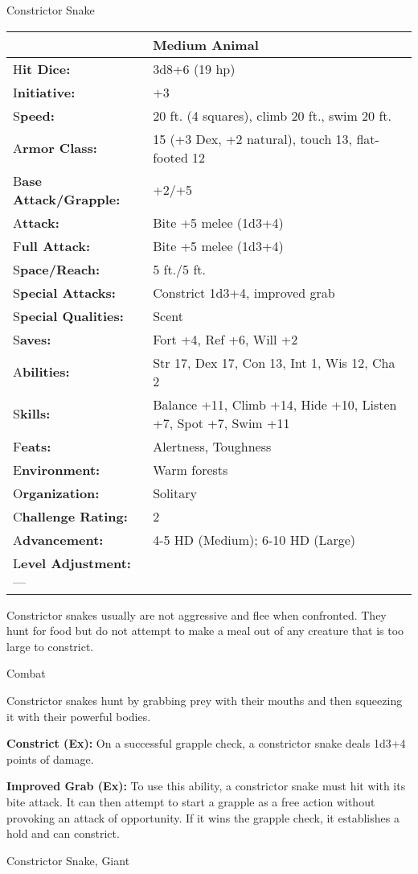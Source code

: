 \documentclass{article}
\begin{document}
\vspace{12pt}
Constrictor Snake

\begin{tabular}{|>{\raggedright}p{84pt}|>{\raggedright}p{242pt}|}
\hline
  & Medium Animal\tabularnewline
\hline
H\textbf{it Dice:} & 3d8+6 (19 hp)\tabularnewline
\hline
I\textbf{nitiative:} & +3\tabularnewline
\hline
S\textbf{peed:} & 20 ft. (4 squares), climb 20 ft., swim 20 ft.\tabularnewline
\hline
A\textbf{rmor Class:} & 15 (+3 Dex, +2 natural), touch 13, flat-footed 12\tabularnewline
\hline
B\textbf{ase Attack/Grapple:} & +2/+5\tabularnewline
\hline
A\textbf{ttack:} & Bite +5 melee (1d3+4)\tabularnewline
\hline
F\textbf{ull Attack:} & Bite +5 melee (1d3+4)\tabularnewline
\hline
S\textbf{pace/Reach:} & 5 ft./5 ft.\tabularnewline
\hline
S\textbf{pecial Attacks:} & Constrict 1d3+4, improved grab\tabularnewline
\hline
S\textbf{pecial Qualities:} & Scent\tabularnewline
\hline
S\textbf{aves:} & Fort +4, Ref +6, Will +2\tabularnewline
\hline
A\textbf{bilities:} & Str 17, Dex 17, Con 13, Int 1, Wis 12, Cha 2\tabularnewline
\hline
S\textbf{kills:} & Balance +11, Climb +14, Hide +10, Listen +7, Spot +7, Swim +11\tabularnewline
\hline
F\textbf{eats:} & Alertness, Toughness\tabularnewline
\hline
E\textbf{nvironment:} & Warm forests\tabularnewline
\hline
O\textbf{rganization:} & Solitary\tabularnewline
\hline
C\textbf{hallenge Rating:} & 2\tabularnewline
\hline
A\textbf{dvancement:} & 4-5 HD (Medium); 6-10 HD (Large)\tabularnewline
\hline
L\textbf{evel Adjustment:}--- & \tabularnewline
\hline
\end{tabular}

Constrictor snakes usually are not aggressive and flee when confronted. They hunt 
for food but do not attempt to make a meal out of any creature that is too large 
to constrict.

Combat

Constrictor snakes hunt by grabbing prey with their mouths and then squeezing it 
with their powerful bodies.

\textbf{Constrict (Ex):} On a successful grapple check, a constrictor snake deals 
1d3+4 points of damage.

\textbf{Improved Grab (Ex):} To use this ability, a constrictor snake must hit 
with its bite attack. It can then attempt to start a grapple as a free action without 
provoking an attack of opportunity. If it wins the grapple check, it establishes 
a hold and can constrict.

\vspace{12pt}
Constrictor Snake, Giant
\end{document}
